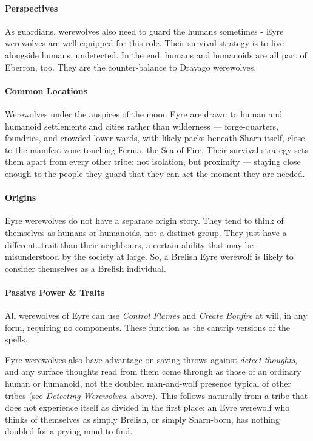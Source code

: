 \documentclass[twocolumn]{dndbook}
\begin{document}
\paragraph*{Perspectives} As guardians, werewolves also need to guard the humans sometimes - Eyre werewolves are well-equipped for this role.
Their survival strategy is to live alongside humans, undetected.
In the end, humans and humanoids are all part of Eberron, too.
They are the counter-balance to Dravago werewolves.\par

\paragraph*{Common Locations} Werewolves under the auspices of the moon Eyre are drawn to human and humanoid settlements and cities rather than wilderness --- forge-quarters, foundries, and crowded lower wards, with likely packs beneath Sharn itself, close to the manifest zone touching Fernia, the Sea of Fire.
Their survival strategy sets them apart from every other tribe: not isolation, but proximity --- staying close enough to the people they guard that they can act the moment they are needed.

\paragraph*{Origins} Eyre werewolves do not have a separate origin story.
They tend to think of themselves as humans or humanoids, not a distinct group.
They just have a different\ldots trait than their neighbours, a certain ability that may be misunderstood by the society at large.
So, a Brelish Eyre werewolf is likely to consider themselves as a Brelish individual.

\paragraph*{Passive Power \& Traits} All werewolves of Eyre can use \emph{Control Flames} and \emph{Create Bonfire} at will, in any form, requiring no components.
These function as the cantrip versions of the spells.

Eyre werewolves also have advantage on saving throws against \emph{detect thoughts}, and any surface thoughts read from them come through as those of an ordinary human or humanoid, not the doubled man-and-wolf presence typical of other tribes (see \hyperref[sec:detecting-werewolves]{\emph{Detecting Werewolves}}, above).
This follows naturally from a tribe that does not experience itself as divided in the first place: an Eyre werewolf who thinks of themselves as simply Brelish, or simply Sharn-born, has nothing doubled for a prying mind to find.
\end{document}
